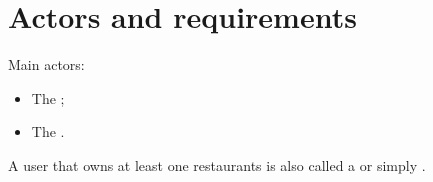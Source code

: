 \chapter{Actors and requirements}\label{ch:requirements}

Main actors:
\begin{itemize}
	\item The ;
	\item The .
\end{itemize}

A user that owns at least one restaurants is also called a
 or simply .



